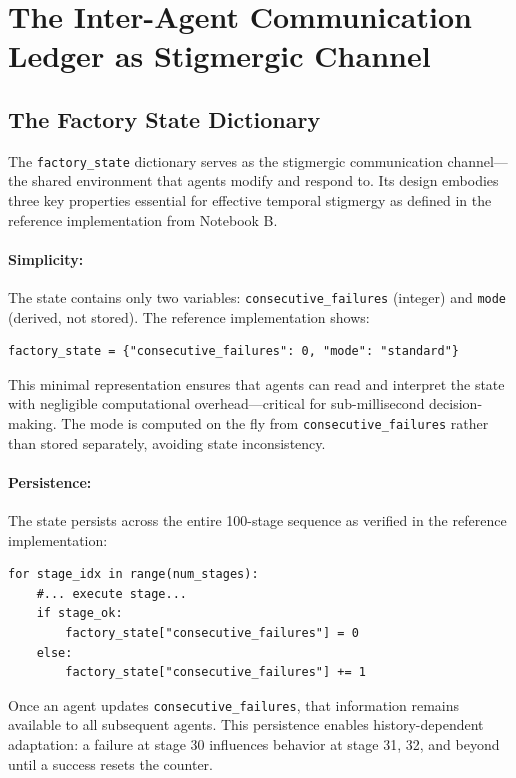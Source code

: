 ﻿\documentclass[12pt,a4paper,oneside]{report}
\begin{document}
\section{The Inter-Agent Communication Ledger as Stigmergic Channel}

\subsection{The Factory State Dictionary}

The \texttt{factory\_state} dictionary serves as the stigmergic communication channel---the shared environment that agents modify and respond to. Its design embodies three key properties essential for effective temporal stigmergy as defined in the reference implementation from Notebook B.

\paragraph{Simplicity:} The state contains only two variables: \texttt{consecutive\_failures} (integer) and \texttt{mode} (derived, not stored). The reference implementation shows:

\begin{verbatim}
factory_state = {"consecutive_failures": 0, "mode": "standard"}
\end{verbatim}

This minimal representation ensures that agents can read and interpret the state with negligible computational overhead---critical for sub-millisecond decision-making. The mode is computed on the fly from \texttt{consecutive\_failures} rather than stored separately, avoiding state inconsistency.

\paragraph{Persistence:} The state persists across the entire 100-stage sequence as verified in the reference implementation:

\begin{verbatim}
for stage_idx in range(num_stages):
    #... execute stage...
    if stage_ok:
        factory_state["consecutive_failures"] = 0
    else:
        factory_state["consecutive_failures"] += 1
\end{verbatim}

Once an agent updates \texttt{consecutive\_failures}, that information remains available to all subsequent agents. This persistence enables history-dependent adaptation: a failure at stage 30 influences behavior at stage 31, 32, and beyond until a success resets the counter.
\end{document}

